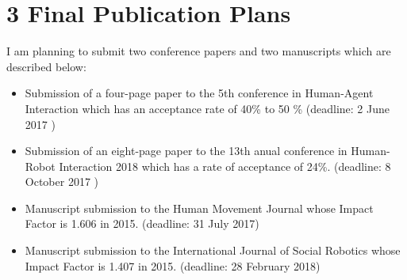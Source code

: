 \documentclass{sigchi}
\begin{document}
\section{3 Final Publication Plans}
I am planning to submit two conference papers and two manuscripts which
are described below:
\begin{itemize}
  \setlength{\itemsep}{0pt}
  \setlength{\parskip}{0pt}
  \item Submission of a four-page paper to the 5th conference in Human-Agent
  Interaction which has an acceptance rate of 40\% to 50 \% (deadline: 2 June 2017 )
  \item Submission of an eight-page paper to the 13th anual conference in Human-Robot
  Interaction 2018 which has a rate of acceptance of 24\%. (deadline: 8 October 2017 )
  \item Manuscript submission to the Human Movement Journal whose Impact Factor
  is 1.606 in 2015. (deadline: 31 July 2017)
  \item Manuscript submission to the International Journal of Social Robotics
  whose Impact Factor is 1.407 in 2015. (deadline: 28 February 2018)
\end{itemize}









\end{document}
